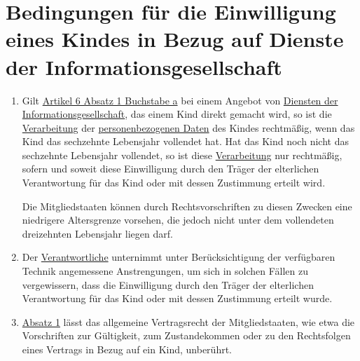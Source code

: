 \chapter{Bedingungen für die Einwilligung eines Kindes in Bezug auf Dienste der Informationsgesellschaft}
\label{ch:8}


\begin{enumerate}

  \item Gilt \hyperref[itm:06-1a]{Artikel 6 Absatz 1 Buchstabe a} bei einem Angebot von \hyperref[itm:04-28]{Diensten der
   Informationsgesellschaft}, das einem Kind direkt gemacht wird, so ist die \hyperref[itm:04-2]{Verarbeitung} der \hyperref[itm:04-1]{personenbezogenen Daten}
   des Kindes rechtmäßig, wenn das Kind das sechzehnte Lebensjahr vollendet hat. Hat das Kind noch nicht das sechzehnte
   Lebensjahr vollendet, so ist diese \hyperref[itm:04-2]{Verarbeitung} nur rechtmäßig, sofern und soweit diese Einwilligung durch den
   Träger der elterlichen Verantwortung für das Kind oder mit dessen Zustimmung erteilt wird. 
  \label{itm:08-1}

   Die Mitgliedstaaten können durch Rechtsvorschriften zu diesen Zwecken eine niedrigere Altersgrenze vorsehen, die
   jedoch nicht unter dem vollendeten dreizehnten Lebensjahr liegen darf.

  \item Der \hyperref[itm:04-7]{Verantwortliche} unternimmt unter Berücksichtigung der verfügbaren Technik angemessene Anstrengungen, um sich
   in solchen Fällen zu vergewissern, dass die Einwilligung durch den Träger der elterlichen Verantwortung für das Kind
   oder mit dessen Zustimmung erteilt wurde.
  \label{itm:08-2}

  \item \hyperref[itm:08-1]{Absatz 1} lässt das allgemeine Vertragsrecht der Mitgliedstaaten, wie etwa die Vorschriften
   zur Gültigkeit, zum Zustandekommen oder zu den Rechtsfolgen eines Vertrags in Bezug auf ein Kind, unberührt.
  \label{itm:08-3}

\end{enumerate}


